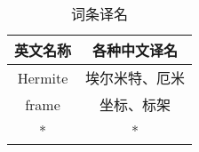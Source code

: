 
\begin{table}[ht]
\centering
\caption{词条译名}\label{text_tab1}
\begin{tabular}{|c|c|}
\hline
英文名称 & 各种中文译名 \\
\hline
Hermite & 埃尔米特、厄米 \\
\hline
frame & 坐标、标架 \\
\hline
* & * \\
\hline
\end{tabular}
\end{table}